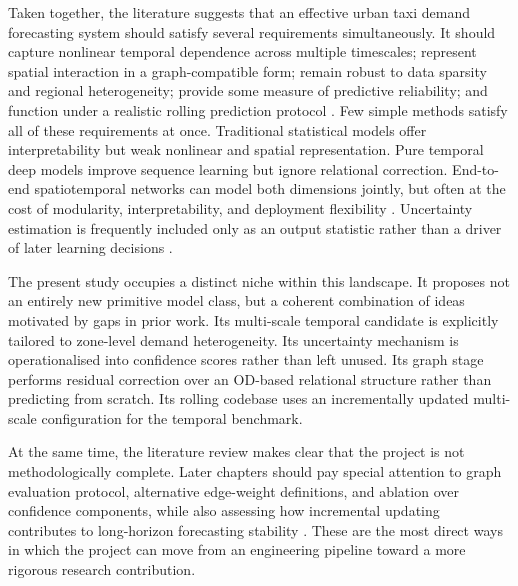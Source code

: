 \documentclass[12pt,a4paper]{report}
\begin{document}
Taken together, the literature suggests that an effective urban taxi demand forecasting system should satisfy several requirements simultaneously. It should capture nonlinear temporal dependence across multiple timescales; represent spatial interaction in a graph-compatible form; remain robust to data sparsity and regional heterogeneity; provide some measure of predictive reliability; and function under a realistic rolling prediction protocol \cite{lim2021survey,jiang2022survey,zhuang2022sparse,hewamalage2022pitfalls}. Few simple methods satisfy all of these requirements at once. Traditional statistical models offer interpretability but weak nonlinear and spatial representation. Pure temporal deep models improve sequence learning but ignore relational correction. End-to-end spatiotemporal networks can model both dimensions jointly, but often at the cost of modularity, interpretability, and deployment flexibility \cite{garcia2023explainability,shao2022d2stgnn}. Uncertainty estimation is frequently included only as an output statistic rather than a driver of later learning decisions \cite{wang2024gnnuncertaintysurvey}.

The present study occupies a distinct niche within this landscape. It proposes not an entirely new primitive model class, but a coherent combination of ideas motivated by gaps in prior work. Its multi-scale temporal candidate is explicitly tailored to zone-level demand heterogeneity. Its uncertainty mechanism is operationalised into confidence scores rather than left unused. Its graph stage performs residual correction over an OD-based relational structure rather than predicting from scratch. Its rolling codebase uses an incrementally updated multi-scale configuration for the temporal benchmark.

At the same time, the literature review makes clear that the project is not methodologically complete. Later chapters should pay special attention to graph evaluation protocol, alternative edge-weight definitions, and ablation over confidence components, while also assessing how incremental updating contributes to long-horizon forecasting stability \cite{hewamalage2022pitfalls,cerqueira2020evaluating,wang2024gnnuncertaintysurvey}. These are the most direct ways in which the project can move from an engineering pipeline toward a more rigorous research contribution.
\end{document}
